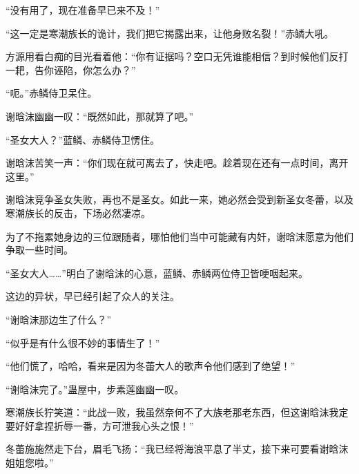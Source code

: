 \begin{this_body}
“没有用了，现在准备早已来不及！”

“这一定是寒潮族长的诡计，我们把它揭露出来，让他身败名裂！”赤鳞大吼。

方源用看白痴的目光看着他：“你有证据吗？空口无凭谁能相信？到时候他们反打一耙，告你诬陷，你怎么办？”

“呃。”赤鳞侍卫呆住。

谢晗沫幽幽一叹：“既然如此，那就算了吧。”

“圣女大人？”蓝鳞、赤鳞侍卫愣住。

谢晗沫苦笑一声：“你们现在就可离去了，快走吧。趁着现在还有一点时间，离开这里。”

谢晗沫竞争圣女失败，再也不是圣女。如此一来，她必然会受到新圣女冬蕾，以及寒潮族长的反击，下场必然凄凉。

为了不拖累她身边的三位跟随者，哪怕他们当中可能藏有内奸，谢晗沫愿意为他们争取一些时间。

“圣女大人……”明白了谢晗沫的心意，蓝鳞、赤鳞两位侍卫皆哽咽起来。

这边的异状，早已经引起了众人的关注。

“谢晗沫那边生了什么？”

“似乎是有什么很不妙的事情生了！”

“他们慌了，哈哈，看来是因为冬蕾大人的歌声令他们感到了绝望！”

“谢晗沫完了。”蛊屋中，步素莲幽幽一叹。

寒潮族长狞笑道：“此战一败，我虽然奈何不了大族老那老东西，但这谢晗沫我定要好好拿捏折辱一番，方可泄我心头之恨！”

冬蕾施施然走下台，眉毛飞扬：“我已经将海浪平息了半丈，接下来可要看谢晗沫姐姐您啦。”

\end{this_body}

